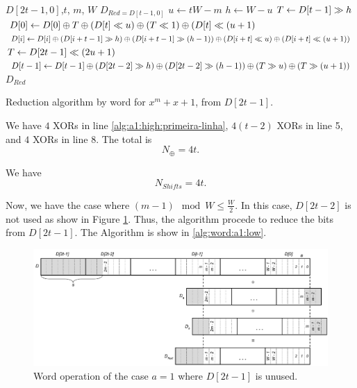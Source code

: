 \begin{algorithm}
  \begin{algorithmic}[1]
  \REQUIRE $D[2t-1,0]$,$t$, $m$, $W$
  \ENSURE $D_{Red = D[t-1,0]}$
  \STATE $u \gets tW - m$
  \STATE $h \gets W - u$
  \STATE $T \gets D[t-1] \gg h$
  \STATE $D[0] \gets D[0] \oplus T \oplus (D[t] \ll u) \oplus (T \ll 1) \oplus (D[t] \ll (u+1)$ \label{alg:a1:high:primeira-linha}
    \STATE $D[i] \gets D[i] \oplus (D[i+t-1] \gg h) \oplus (D[i+t-1] \gg (h-1)) \oplus (D[i+t] \ll u) \oplus (D[i+t] \ll (u+1))$
    \ENDFOR
  \STATE $T \gets D[2t-1] \ll (2u+1)$\ 
  \STATE $D[t-1] \gets D[t-1] \oplus (D[2t-2] \gg h) \oplus (D[2t-2] \gg (h-1)) \oplus (T \gg u) \oplus (T \gg (u+1))$
  \RETURN $D_{Red}$
  \caption{Reduction algorithm by word for $x^m + x + 1$, from $D[2t-1]$.}
  \label{alg:word:a1:high}
\end{algorithmic}
\end{algorithm}

We have $4$ XORs in line \ref{alg:a1:high:primeira-linha}, $4(t-2)$ XORs in line 5, and $4$ XORs in line 8. The total is $$N_\oplus = 4t.$$

We have $$N_{Shifts} = 4t.$$

Now, we have the case where $(m-1) \mod{W} \leq \frac{W}{2}$. In this case, $D[2t-2]$ is not used as show in Figure \ref{fig:word:operation:alg:a1:low}. Thus, the algorithm procede to reduce the bits from $D[2t-1]$. The Algorithm is show in \ref{alg:word:a1:low}.

\begin{figure}[htb]
  \centering
  \includegraphics[width = \columnwidth]{figures/two-elements-reduction-a-1-low.pdf}
\caption{Word operation of the case $a=1$ where $D[2t-1]$ is unused.}
\label{fig:word:operation:alg:a1:low}
\end{figure}

